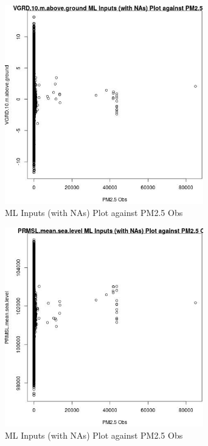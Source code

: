 \begin{figure} 
\centering  
\includegraphics[width=0.77\textwidth]{Code_Outputs/Report_ML_input_PM25_Step4_part_f_de_duplicated_aveswNAs_VGRD10mabovegroundvPM25_Obs.jpg} 
\caption{\label{fig:Report_ML_input_PM25_Step4_part_f_de_duplicated_aveswNAsVGRD10mabovegroundvPM25_Obs}ML Inputs (with NAs) Plot against PM2.5 Obs} 
\end{figure} 
 

\begin{figure} 
\centering  
\includegraphics[width=0.77\textwidth]{Code_Outputs/Report_ML_input_PM25_Step4_part_f_de_duplicated_aveswNAs_PRMSLmeansealevelvPM25_Obs.jpg} 
\caption{\label{fig:Report_ML_input_PM25_Step4_part_f_de_duplicated_aveswNAsPRMSLmeansealevelvPM25_Obs}ML Inputs (with NAs) Plot against PM2.5 Obs} 
\end{figure} 
 

